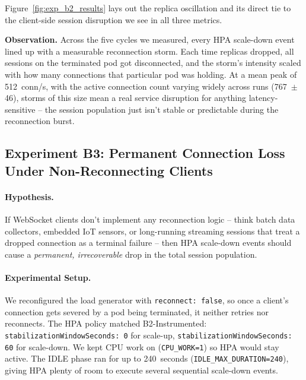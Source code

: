 \documentclass[twocolumn]{svjour3}
\begin{document}
Figure~\ref{fig:exp_b2_results} lays out the replica oscillation and its direct
tie to the client-side session disruption we see in all three metrics.

\noindent\textbf{Observation.} Across the five cycles we measured, every HPA
scale-down event lined up with a measurable reconnection storm. Each time replicas
dropped, all sessions on the terminated pod got disconnected, and the storm's
intensity scaled with how many connections that particular pod was holding. At a
mean peak of 512~conn/s, with the active connection count varying widely across
runs (767~$\pm$46), storms of this size mean a real service disruption for
anything latency-sensitive -- the session population just isn't stable or
predictable during the reconnection burst.

\subsection{Experiment B3: Permanent Connection Loss Under Non-Reconnecting Clients}
\label{sec:b3}

\paragraph{Hypothesis.} If WebSocket clients don't implement any reconnection
logic -- think batch data collectors, embedded IoT sensors, or long-running
streaming sessions that treat a dropped connection as a terminal failure -- then
HPA scale-down events should cause a \textit{permanent, irrecoverable} drop in the
total session population.

\paragraph{Experimental Setup.} We reconfigured the load generator with
\texttt{reconnect: false}, so once a client's connection gets severed by a pod
being terminated, it neither retries nor reconnects. The HPA policy matched
B2-Instrumented: \texttt{stabilizationWindowSeconds: 0} for scale-up,
\texttt{stabilizationWindowSeconds: 60} for scale-down. We kept CPU work on
(\texttt{CPU\_WORK=1}) so HPA would stay active. The IDLE phase ran for up to
240~seconds (\texttt{IDLE\_MAX\_DURATION=240}), giving HPA plenty of room to
execute several sequential scale-down events.
\end{document}

